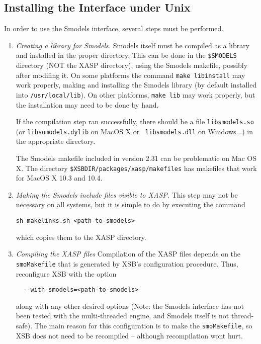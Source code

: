 \subsection{Installing the Interface under Unix}

In order to use the Smodels interface, several steps must be
performed.  

\begin{enumerate}
\item {\em Creating a library for Smodels.} Smodels itself must be
  compiled as a library and installed in the proper directory.  This
  can be done in the {\tt \$SMODELS} directory (NOT the XASP
  directory), using the Smodels makefile, possibly after modifing it.
  On some platforms the command {\tt make libinstall} may work
  properly, making and installing the Smodels library (by default
  installed into {\tt /usr/local/lib}).  On other platforms, {\tt make
    lib} may work properly, but the installation may need to be done
  by hand.

  If the compilation step ran successfully, there should be a file
  {\tt libsmodels.so} (or {\tt libsomodels.dylib} on MacOS X or {\tt
    libsmodels.dll} on Windows...) in the appropriate directory.

  The Smodels makefile included in version 2.31 can be problematic on
  Mac OS X.  The directory {\tt \$XSBDIR/packages/xasp/makefiles} has
  makefiles that work for MacOS X 10.3 and 10.4.

\item {\em Making the Smodels include files visible to XASP.}  This
  step may not be necessary on all systems, but it is simple to do by
  executing the command
%
\begin{verbatim}
sh makelinks.sh <path-to-smodels>
\end{verbatim}
%
which copies them to the XASP directory.

\item {\em Compiling the XASP files} Compilation of the XASP files
  depends on the {\tt smoMakefile} that is generated by XSB's
  configuration procedure.  Thus, reconfigure XSB with the option
\begin{verbatim}
  --with-smodels=<path-to-smodels> 
\end{verbatim}
  along with any other desired options (Note: the Smodels interface
  has not been tested with the multi-threaded engine, and Smodels
  itself is not thread-safe).  The main reason for this configuration
  is to make the {\tt smoMakefile}, so XSB does not need to be
  recompiled -- although recompilation wont hurt.


\end{enumerate}
